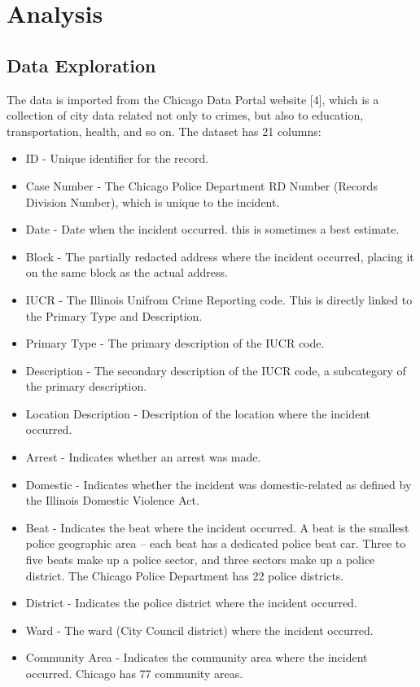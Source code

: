 \documentclass[12pt]{article}
\begin{document}
\section{Analysis}
\subsection{Data Exploration}
The data is imported from the Chicago Data Portal website [4], which is a collection of city data related not only to crimes, but also to education, transportation, health, and so on.
The dataset has 21 columns:
\begin{itemize}
\item ID - Unique identifier for the record.
\item Case Number - The Chicago Police Department RD Number (Records Division Number), which is unique to the incident.
\item Date - Date when the incident occurred. this is sometimes a best estimate.
\item Block - The partially redacted address where the incident occurred, placing it on the same block as the actual address.
\item IUCR - The Illinois Unifrom Crime Reporting code. This is directly linked to the Primary Type and Description.
\item Primary Type - The primary description of the IUCR code.
\item Description - The secondary description of the IUCR code, a subcategory of the primary description.
\item Location Description - Description of the location where the incident occurred.
\item Arrest - Indicates whether an arrest was made.
\item Domestic - Indicates whether the incident was domestic-related as defined by the Illinois Domestic Violence Act.
\item Beat - Indicates the beat where the incident occurred. A beat is the smallest police geographic area – each beat has a dedicated police beat car. Three to five beats make up a police sector, and three sectors make up a police district. The Chicago Police Department has 22 police districts.
\item District - Indicates the police district where the incident occurred.
\item Ward - The ward (City Council district) where the incident occurred.
\item Community Area - Indicates the community area where the incident occurred. Chicago has 77 community areas.

\end{itemize}
\end{document}
